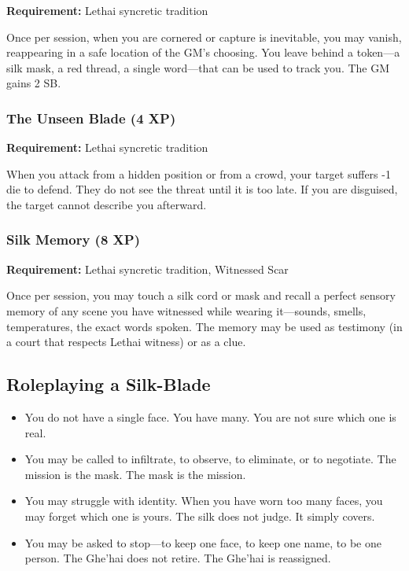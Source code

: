 \textbf{Requirement:} Lethai syncretic tradition

Once per session, when you are cornered or capture is inevitable, you may vanish, reappearing in a safe location of the GM's choosing. You leave behind a token—a silk mask, a red thread, a single word—that can be used to track you. The GM gains 2 SB.

\subsubsection{The Unseen Blade (4 XP)}

\textbf{Requirement:} Lethai syncretic tradition

When you attack from a hidden position or from a crowd, your target suffers -1 die to defend. They do not see the threat until it is too late. If you are disguised, the target cannot describe you afterward.

\subsubsection{Silk Memory (8 XP)}

\textbf{Requirement:} Lethai syncretic tradition, Witnessed Scar

Once per session, you may touch a silk cord or mask and recall a perfect sensory memory of any scene you have witnessed while wearing it—sounds, smells, temperatures, the exact words spoken. The memory may be used as testimony (in a court that respects Lethai witness) or as a clue.

\subsection{Roleplaying a Silk-Blade}

\begin{itemize}
\item You do not have a single face. You have many. You are not sure which one is real.
\item You may be called to infiltrate, to observe, to eliminate, or to negotiate. The mission is the mask. The mask is the mission.
\item You may struggle with identity. When you have worn too many faces, you may forget which one is yours. The silk does not judge. It simply covers.
\item You may be asked to stop—to keep one face, to keep one name, to be one person. The Ghe'hai does not retire. The Ghe'hai is reassigned.
\end{itemize}

